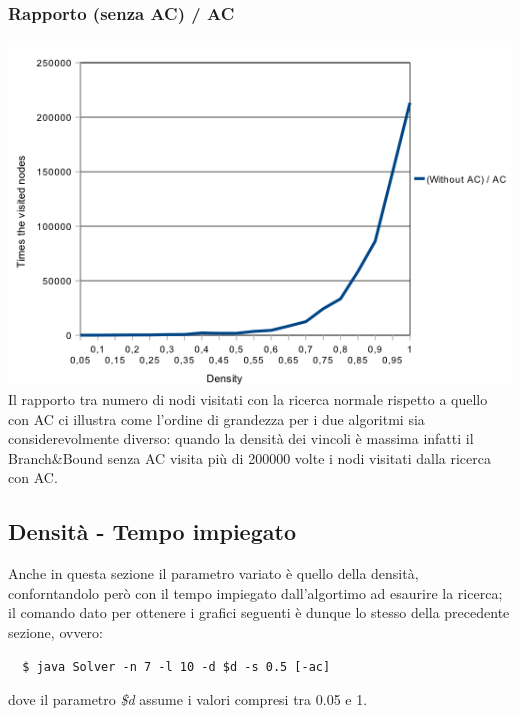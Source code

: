 \documentclass[a4paper,12pt,italian]{article}
\begin{document}
\subsubsection{Rapporto (senza AC) / AC}
\includegraphics[scale=0.8]{densNodesQuotient.png}
\\
Il rapporto tra numero di nodi visitati con la ricerca normale rispetto a quello con AC ci illustra
come l'ordine di grandezza per i due algoritmi sia considerevolmente diverso: quando la densit\`a dei vincoli
\`e massima infatti il Branch\&Bound senza AC visita pi\`u di 200000 volte i nodi visitati dalla ricerca con AC.

\subsection{Densit\`a - Tempo impiegato}
Anche in questa sezione il parametro variato \`e quello della densit\`a, conforntandolo per\`o
con il tempo impiegato dall'algortimo ad esaurire la ricerca; il comando dato per ottenere i grafici seguenti
\`e dunque lo stesso della precedente sezione, ovvero:
\begin{verbatim}
  $ java Solver -n 7 -l 10 -d $d -s 0.5 [-ac]
\end{verbatim}
dove il parametro \textit{\$d} assume i valori compresi tra 0.05 e 1.
\end{document}
